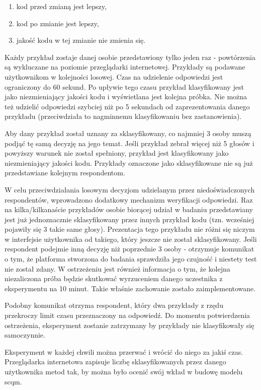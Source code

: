 \documentclass[12pt]{report}
\begin{document}
\begin{enumerate}
\item kod przed zmianą jest lepszy,
\item kod po zmianie jest lepszy,
\item jakość kodu w tej zmianie nie zmienia się.
\end{enumerate}

Każdy przykład zostaje danej osobie przedstawiony tylko jeden raz - powtórzenia są wykluczane na poziomie przeglądarki internetowej. Przykłady są podawane użytkownikom w kolejności losowej. Czas na udzielenie odpowiedzi jest ograniczony do 60 sekund. Po upływie tego czasu przykład klasyfikowany jest jako niezmieniający jakości kodu i wyświetlana jest kolejna próbka. Nie można też udzielić odpowiedzi szybciej niż po 5 sekundach od zaprezentowania danego przykładu (przeciwdziała to nagminnemu klasyfikowaniu bez zastanowienia).

Aby dany przykład został uznany za sklasyfikowany, co najmniej 3 osoby muszą podjąć tę samą decyzję na jego temat. Jeśli przykład zebrał więcej niż 5 głosów i powyższy warunek nie został spełniony, przykład jest klasyfikowany jako niezmieniający jakości kodu. Przykłady oznaczone jako sklasyfikowane nie są już przedstawiane kolejnym respondentom.

W celu przeciwdziałania losowym decyzjom udzielanym przez niedoświadczonych respondentów, wprowadzono dodatkowy mechanizm weryfikacji odpowiedzi. Raz na kilka/kilkanaście przykładów osobie biorącej udział w badaniu przedstawiany jest już jednoznacznie sklasyfikowany przez innych przykład kodu (tzn. wcześniej pojawiły się 3 takie same głosy). Prezentacja tego przykładu nie różni się niczym w interfejsie użytkownika od takiego, który jeszcze nie został sklasyfikowany. Jeśli respondent podejmie inną decyzję niż poprzednie 3 osoby - otrzymuje komunikat o tym, że platforma stworzona do badania sprawdziła jego czujność i niestety test nie został zdany. W ostrzeżeniu jest również informacja o tym, że kolejna niezaliczona próba będzie skutkować wyrzuceniem danego uczestnika z eksperymentu na 10 minut. Takie właśnie zachowanie zostało zaimplementowane.

Podobny komunikat otrzyma respondent, który dwa przykłady z rzędu przekroczy limit czasu przeznaczony na odpowiedź. Do momentu potwierdzenia ostrzeżenia, eksperyment zostanie zatrzymany by przykłady nie klasyfikowały się samoczynnie.

Eksperyment w każdej chwili można przerwać i wrócić do niego za jakiś czas. Przeglądarka internetowa zapisuje liczbę sklasyfikowanych przez danego użytkownika metod tak, by można było ocenić swój wkład w budowę modelu \gls{scqm}.
\end{document}
